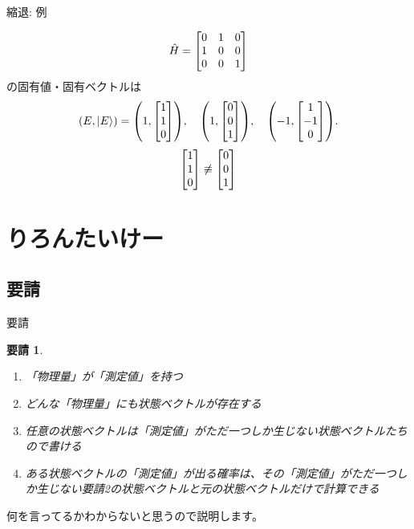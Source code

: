 \documentclass[dvipdfm]{beamer}
\newtheorem*{requirement}{要請}
\begin{document}
\begin{frame}{縮退: 例}
    \begin{example}
        \begin{equation*}
            \hat{H}
            =
            \mqty[0 & 1 & 0 \\ 1 & 0 & 0 \\ 0 & 0 & 1]
        \end{equation*}
        の固有値・固有ベクトルは
        \begin{equation*}
            \qty(E,\ket{E})
            =
            \qty(1,\mqty[1 \\ 1 \\ 0]),
            \quad
            \qty(1,\mqty[0 \\ 0 \\ 1]),
            \quad
            \qty(-1,\mqty[1 \\ -1 \\ 0]).
        \end{equation*}
        \begin{equation*}
            \mqty[1 \\ 1 \\ 0]
            \not\equiv
            \mqty[0 \\ 0 \\ 1]
        \end{equation*}
    \end{example}
\end{frame}


\section{りろんたいけー}

\subsection{要請}

\begin{frame}{要請}
    \begin{requirement}
        \begin{enumerate}
            \item 「物理量」が「測定値」を持つ
            \item どんな「物理量」にも状態ベクトルが存在する
            \item 任意の状態ベクトルは「測定値」がただ一つしか生じない状態ベクトルたちので書ける
            \item ある状態ベクトルの「測定値」が出る確率は、その「測定値」がただ一つしか生じない要請2の状態ベクトルと元の状態ベクトルだけで計算できる
        \end{enumerate}
    \end{requirement}
    何を言ってるかわからないと思うので説明します。
\end{frame}
\end{document}
